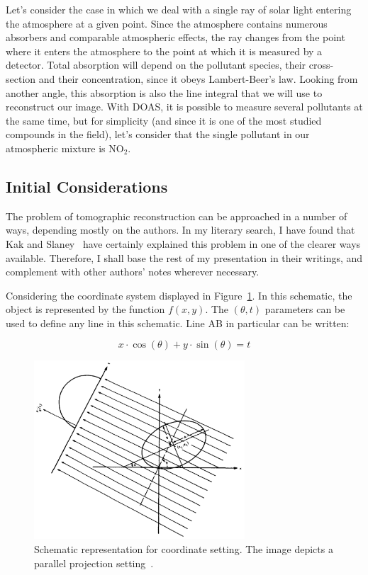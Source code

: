 Let's consider the case in which we deal with a single ray of solar
light entering the atmosphere at a given point. Since the atmosphere
contains numerous absorbers and comparable atmospheric effects, the ray
changes from the point where it enters the atmosphere to the point at
which it is measured by a detector. Total absorption will depend on the
pollutant species, their cross-section and their concentration, since it
obeys Lambert-Beer's law. Looking from another angle, this absorption
is also the line integral that we will use to reconstruct our image.
With \gls{DOAS}, it is possible to measure several pollutants at the
same time, but for simplicity (and since it is one of the most studied
compounds in the field), let's consider that the single pollutant in our
atmospheric mixture is NO$_2$.

\subsection{Initial Considerations}%
\label{sub:initial_considerations}

The problem of tomographic reconstruction can be approached in a number
of ways, depending mostly on the authors. In my literary search, I have
found that Kak and Slaney~\cite{Kak2001} have certainly explained this
problem in one of the clearer ways available. Therefore, I shall base
the rest of my presentation in their writings, and complement with other
authors' notes wherever necessary.

Considering the coordinate system displayed in
Figure~\ref{fig:coordinates}. In this schematic, the object is
represented by the function $f(x, y)$. The  $(\theta, t)$ parameters can
be used to define any line in this schematic. Line AB in particular can
be written:

\begin{equation}
    \label{eq:lineAB}
    x \cdot \cos(\theta) + y \cdot \sin(\theta) = t
\end{equation}

\begin{figure}[htpb]
    \centering
    \includegraphics[width=0.7\textwidth]{img/png/coordinates.png}
    \caption{Schematic representation for coordinate setting. The image
    depicts a parallel projection setting~\cite{Kak2001a}.}
    \label{fig:coordinates}
\end{figure}

